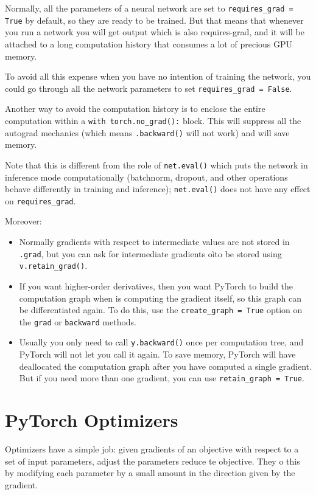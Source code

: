 Normally, all the parameters of a neural network are set to \texttt{requires\_grad = True} by default, so they are ready to be trained. But that means that whenever you run a network you will get output which is also requires-grad, and it will be attached to a long computation history that consumes a lot of precious GPU memory. 

To avoid all this expense when you have no intention of training the network, you could go through all the network parameters to set \texttt{requires\_grad = False}.

Another way to avoid the computation history is to enclose the entire computation within a \texttt{with torch.no\_grad():} block. This will suppress all the autograd mechanics (which means \texttt{.backward()} will not work) and will save memory.

Note that this is different from the role of \texttt{net.eval()} which puts the network in inference mode computationally (batchnorm, dropout, and other operations behave differently in training and inference); \texttt{net.eval()} does not have any effect on \texttt{requires\_grad}.

Moreover:
\begin{itemize}
    \item Normally gradients with respect to intermediate values are not stored in \texttt{.grad}, but you can ask for intermediate gradients oìto be stored using \texttt{v.retain\_grad()}.
    \item If you want higher-order derivatives, then you want PyTorch to build the computation graph when is computing the gradient itself, so this graph can be differentiated again. To do this, use the \texttt{create\_graph = True} option on the \texttt{grad} or \texttt{backward} methods. 
    \item Usually you only need to call \texttt{y.backward()} once per computation tree, and PyTorch will not let you call it again. To save memory, PyTorch will have deallocated the computation graph after you have computed a single gradient. But if you need more than one gradient, you can use \texttt{retain\_graph = True}.
\end{itemize}


\section{PyTorch Optimizers}

Optimizers have a simple job: given gradients of an objective with respect to a set of input parameters, adjust the parameters reduce te objective. They o this by modifying each parameter by a small amount in the direction given by the gradient. 

